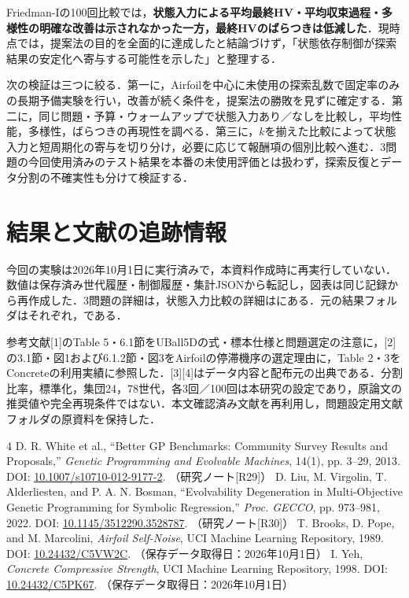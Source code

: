 \documentclass[a4paper,10pt,twocolumn]{ltjsarticle}
\begin{document}
Friedman-Iの100回比較では，\textbf{状態入力による平均最終HV・平均収束過程・多様性の明確な改善は示されなかった一方，最終HVのばらつきは低減した}．現時点では，提案法の目的を全面的に達成したと結論づけず，「状態依存制御が探索結果の安定化へ寄与する可能性を示した」と整理する．

次の検証は三つに絞る．第一に，Airfoilを中心に未使用の探索乱数で固定率のみの長期予備実験を行い，改善が続く条件を，提案法の勝敗を見ずに確定する．第二に，同じ問題・予算・ウォームアップで状態入力あり／なしを比較し，平均性能，多様性，ばらつきの再現性を調べる．第三に，\(k\)を揃えた比較によって状態入力と短周期化の寄与を切り分け，必要に応じて報酬項の個別比較へ進む．3問題の今回使用済みのテスト結果を本番の未使用評価とは扱わず，探索反復とデータ分割の不確実性も分けて検証する．

\section*{結果と文献の追跡情報}
今回の実験は2026年10月1日に実行済みで，本資料作成時に再実行していない．数値は保存済み世代履歴・制御履歴・集計JSONから転記し，図表は同じ記録から再作成した．3問題の詳細は，状態入力比較の詳細はにある．元の結果フォルダはそれぞれ，である．

参考文献[1]のTable 5・6.1節をUBall5Dの式・標本仕様と問題選定の注意に，[2]の3.1節・図1および6.1.2節・図3をAirfoilの停滞機序の選定理由に，Table 2・3をConcreteの利用実績に参照した．[3][4]はデータ内容と配布元の出典である．分割比率，標準化，集団24，78世代，各3回／100回は本研究の設定であり，原論文の推奨値や完全再現条件ではない．本文確認済み文献を再利用し，問題設定用文献フォルダの原資料を保持した．

\begin{thebibliography}{4}
\footnotesize
{}
D. R. White et al., ``Better GP Benchmarks: Community Survey Results and Proposals,''
\emph{Genetic Programming and Evolvable Machines}, 14(1), pp. 3--29, 2013.
DOI: \href{https://doi.org/10.1007/s10710-012-9177-2}{10.1007/s10710-012-9177-2}.
（研究ノート[R29]）
D. Liu, M. Virgolin, T. Alderliesten, and P. A. N. Bosman,
``Evolvability Degeneration in Multi-Objective Genetic Programming for Symbolic Regression,''
\emph{Proc. GECCO}, pp. 973--981, 2022.
DOI: \href{https://doi.org/10.1145/3512290.3528787}{10.1145/3512290.3528787}.
（研究ノート[R30]）
T. Brooks, D. Pope, and M. Marcolini, \emph{Airfoil Self-Noise}, UCI Machine Learning Repository, 1989.
DOI: \href{https://doi.org/10.24432/C5VW2C}{10.24432/C5VW2C}.
（保存データ取得日：2026年10月1日）
I. Yeh, \emph{Concrete Compressive Strength}, UCI Machine Learning Repository, 1998.
DOI: \href{https://doi.org/10.24432/C5PK67}{10.24432/C5PK67}.
（保存データ取得日：2026年10月1日）
\end{thebibliography}
\end{document}
